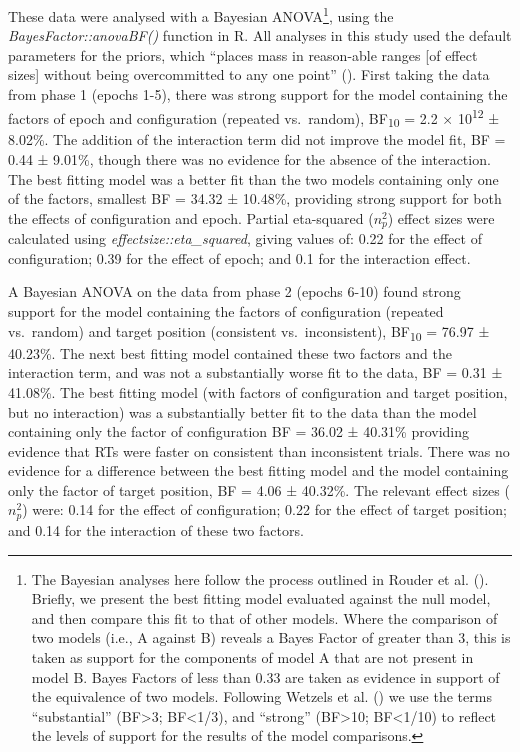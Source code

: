 \documentclass[
  man,
  floatsintext,
  longtable,
  nolmodern,
  notxfonts,
  notimes,
  colorlinks=true,linkcolor=blue,citecolor=blue,urlcolor=blue]{apa7}
\begin{document}
These data were analysed with a Bayesian ANOVA\footnote{The Bayesian
  analyses here follow the process outlined in Rouder et al.
  (). Briefly, we present the best
  fitting model evaluated against the null model, and then compare this
  fit to that of other models. Where the comparison of two models (i.e.,
  A against B) reveals a Bayes Factor of greater than 3, this is taken
  as support for the components of model A that are not present in model
  B. Bayes Factors of less than 0.33 are taken as evidence in support of
  the equivalence of two models. Following Wetzels et al.
  () we use the terms ``substantial''
  (BF\textgreater3; BF\textless1/3), and ``strong'' (BF\textgreater10;
  BF\textless1/10) to reflect the levels of support for the results of
  the model comparisons.}, using the \emph{BayesFactor::anovaBF()}
function in R. All analyses in this study used the default parameters
for the priors, which ``places mass in reason-able ranges {[}of effect
sizes{]} without being overcommitted to any one point''
(). First taking
the data from phase 1 (epochs 1-5), there was strong support for the
model containing the factors of epoch and configuration (repeated
vs.~random), BF\textsubscript{10} = 2.2 × 10\textsuperscript{12} ±
8.02\%. The addition of the interaction term did not improve the model
fit, BF = 0.44 ± 9.01\%, though there was no evidence for the absence of
the interaction. The best fitting model was a better fit than the two
models containing only one of the factors, smallest BF = 34.32 ±
10.48\%, providing strong support for both the effects of configuration
and epoch. Partial eta-squared (\(n^2_p\)) effect sizes were calculated
using \emph{effectsize::eta\_squared}, giving values of: 0.22 for the
effect of configuration; 0.39 for the effect of epoch; and 0.1 for the
interaction effect.

A Bayesian ANOVA on the data from phase 2 (epochs 6-10) found strong
support for the model containing the factors of configuration (repeated
vs.~random) and target position (consistent vs.~inconsistent),
BF\textsubscript{10} = 76.97 ± 40.23\%. The next best fitting model
contained these two factors and the interaction term, and was not a
substantially worse fit to the data, BF = 0.31 ± 41.08\%. The best
fitting model (with factors of configuration and target position, but no
interaction) was a substantially better fit to the data than the model
containing only the factor of configuration BF = 36.02 ± 40.31\%
providing evidence that RTs were faster on consistent than inconsistent
trials. There was no evidence for a difference between the best fitting
model and the model containing only the factor of target position, BF =
4.06 ± 40.32\%. The relevant effect sizes (\(n^2_p\)) were: 0.14 for the
effect of configuration; 0.22 for the effect of target position; and
0.14 for the interaction of these two factors.
\end{document}
